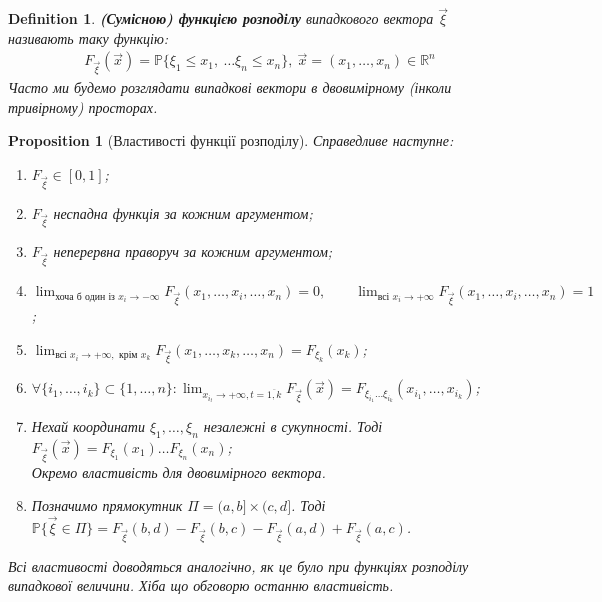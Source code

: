 \documentclass[a4paper, 10pt]{article}
\theoremstyle{theoremdd}
\newtheorem{definition}[theorem]{Definition}
\newtheorem{proposition}[theorem]{Proposition}
\begin{document}
\begin{definition}
\textbf{(Сумісною) функцією розподілу} випадкового вектора $\vec{\xi}$ називають таку функцію:
\begin{align*}
F_{\vec{\xi}}(\vec{x}) = \mathbb{P}\{\xi_1 \leq x_1,\ \dots \xi_n \leq x_n\},\ \vec{x} = (x_1,\dots,x_n) \in \mathbb{R}^n
\end{align*}
Часто ми будемо розглядати випадкові вектори в двовимірному (інколи тривірному) просторах. 
\end{definition}

\begin{proposition}[Властивості функції розподілу]
Справедливе наступне:
\begin{enumerate}[nosep,wide=0pt,label={\arabic*)}]
\item $F_{\vec{\xi}} \in [0,1]$;
\item $F_{\vec{\xi}}$ неспадна функція за кожним аргументом;
\item $F_{\vec{\xi}}$ неперервна праворуч за кожним аргументом;
\item $\displaystyle\lim_{\text{хоча б один із } x_i \to -\infty} F_{\vec{\xi}}(x_1,\dots,x_i,\dots,x_n) = 0, \qquad \lim_{\text{всі }x_i \to +\infty} F_{\vec{\xi}}(x_1,\dots,x_i,\dots,x_n) = 1$;
\item $\displaystyle\lim_{\text{всі }x_i \to +\infty, \text{ крім }x_k} F_{\vec{\xi}}(x_1,\dots,x_k,\dots,x_n) = F_{\xi_k}(x_k)$;
\item $\forall \{i_1,\dots,i_k\} \subset \{1,\dots,n\}: \displaystyle\lim_{x_{i_t} \to +\infty, t = \overline{1,k}} F_{\vec{\xi}}(\vec{x}) = F_{\xi_{i_1}\dots \xi_{i_k}}(x_{i_1},\dots,x_{i_k})$;
\item Нехай координати $\xi_1,\dots,\xi_n$ незалежні в сукупності. Тоді $F_{\vec{\xi}}(\vec{x}) = F_{\xi_1}(x_1) \dots F_{\xi_n}(x_n)$;
\bigskip \\
Окремо властивість для двовимірного вектора.
\item Позначимо прямокутник $\Pi = (a,b] \times (c,d]$. Тоді $\mathbb{P}\{\vec{\xi} \in \Pi\} = F_{\vec{\xi}}(b,d) - F_{\vec{\xi}}(b,c) - F_{\vec{\xi}}(a,d) + F_{\vec{\xi}}(a,c)$.
\end{enumerate}
\textit{Всі властивості доводяться аналогічно, як це було при функціях розподілу випадкової величини. Хіба що обговорю останню властивість.}
\end{proposition}
\end{document}
